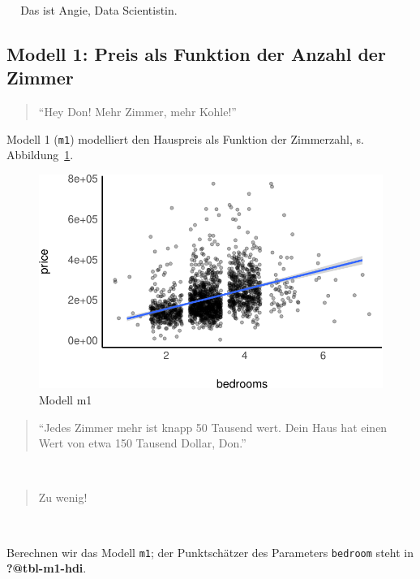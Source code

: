 \documentclass[
  a4paper,
  DIV=11]{scrreprt}
\theoremstyle{definition}
\theoremstyle{remark}
\begin{document}
👩 🔬 Das ist Angie, Data Scientistin.

\hypertarget{modell-1-preis-als-funktion-der-anzahl-der-zimmer}{%
\subsection{Modell 1: Preis als Funktion der Anzahl der
Zimmer}\label{modell-1-preis-als-funktion-der-anzahl-der-zimmer}}

\begin{quote}
``Hey Don! Mehr Zimmer, mehr Kohle!'' 👩 🔬
\end{quote}

Modell 1 (\texttt{m1}) modelliert den Hauspreis als Funktion der
Zimmerzahl, s. Abbildung~\ref{fig-m1}.

\begin{figure}

{\centering \includegraphics{./kausal_files/figure-pdf/fig-m1-1.pdf}

}

\caption{\label{fig-m1}Modell m1}

\end{figure}

\begin{quote}
``Jedes Zimmer mehr ist knapp 50 Tausend wert. Dein Haus hat einen Wert
von etwa 150 Tausend Dollar, Don.''
\end{quote}

👩

\begin{quote}
Zu wenig! 🤬
\end{quote}

🧑

Berechnen wir das Modell \texttt{m1}; der Punktschätzer des Parameters
\texttt{bedroom} steht in \textbf{?@tbl-m1-hdi}.
\end{document}
